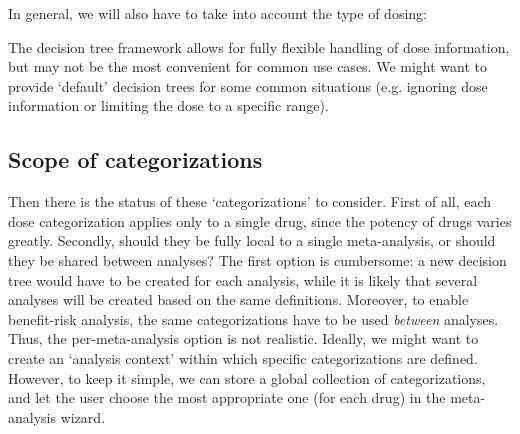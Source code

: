 \documentclass[a4paper]{article}
\begin{document}
In general, we will also have to take into account the type of dosing:

\begin{center}
\end{center}

The decision tree framework allows for fully flexible handling of dose information, but may not be the most convenient for common use cases.
We might want to provide `default' decision trees for some common situations (e.g. ignoring dose information or limiting the dose to a specific range).

\subsection{Scope of categorizations}

Then there is the status of these `categorizations' to consider.
First of all, each dose categorization applies only to a single drug, since the potency of drugs varies greatly.
Secondly, should they be fully local to a single meta-analysis, or should they be shared between analyses?
The first option is cumbersome: a new decision tree would have to be created for each analysis, while it is likely that several analyses will be created based on the same definitions.
Moreover, to enable benefit-risk analysis, the same categorizations have to be used {\em between} analyses.
Thus, the per-meta-analysis option is not realistic.
Ideally, we might want to create an `analysis context' within which specific categorizations are defined.
However, to keep it simple, we can store a global collection of categorizations, and let the user choose the most appropriate one (for each drug) in the meta-analysis wizard.
\end{document}
